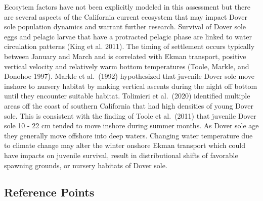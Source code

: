 \documentclass[11pt,
  english,
  a4paper,
]{article}
\begin{document}
Ecosytem factors have not been explicitly modeled in this assessment but there are several aspects of the California current ecosystem that may impact Dover sole population dynamics and warrant further research. Survival of Dover sole eggs and pelagic larvae that have a protracted pelagic phase are linked to water circulation patterns {(King et al. 2011)\leavevmode\tagmcend\tagstructend}. The timing of settlement occurs typically between January and March and is correlated with Ekman transport, positive vertical velocity and relatively warm bottom temperatures {(Toole, Markle, and Donohoe 1997)\leavevmode\tagmcend\tagstructend}. Markle et al.~{(1992)\leavevmode\tagmcend\tagstructend} hypothesized that juvenile Dover sole move inshore to nursery habitat by making vertical ascents during the night off bottom until they encounter suitable habitat. Tolimieri et al.~{(2020)\leavevmode\tagmcend\tagstructend} identified multiple areas off the coast of southern California that had high densities of young Dover sole. This is consistent with the finding of Toole et al.~{(2011)\leavevmode\tagmcend\tagstructend} that juvenile Dover sole 10 - 22 cm tended to move inshore during summer months. As Dover sole age they generally move offshore into deep waters. Changing water temperature due to climate change may alter the winter onshore Ekman transport which could have impacts on juvenile survival, result in distributional shifts of favorable spawning grounds, or nursery habitats of Dover sole.

\leavevmode\tagmcend\tagstructend\par


\hypertarget{reference-points}{%
\subsection*{Reference Points}\label{reference-points}}

\leavevmode\tagmcend\tagstructend

\end{document}
